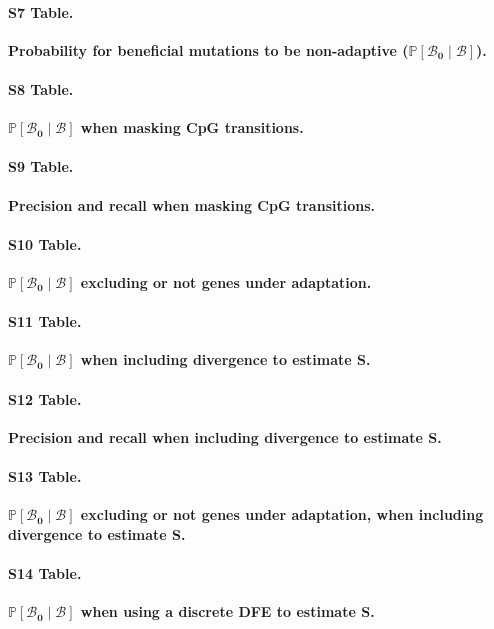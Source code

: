 \documentclass[10pt,letterpaper]{article}
\newcommand{\proba}{\mathbb{P}}
\newcommand{\SphyBen}{\mathcal{B}_0}
\newcommand{\given}{\mid}
\newcommand{\Spop}{S}
\newcommand{\SpopBen}{\mathcal{B}}
\begin{document}
\paragraph*{S7 Table.}
\label{S7_Table}
{\bf Probability for beneficial mutations to be non-adaptive ($\bm{\proba[\SphyBen\given \SpopBen ]}$).}

\paragraph*{S8 Table.}
\label{S8_Table}
{\bf $\bm{\proba[\SphyBen\given \SpopBen ]}$ when masking CpG transitions.}

\paragraph*{S9 Table.}
\label{S9_Table}
{\bf Precision and recall when masking CpG transitions.}

\paragraph*{S10 Table.}
\label{S10_Table}
{\bf $\bm{\proba[\SphyBen\given \SpopBen ]}$ excluding or not genes under adaptation.}

\paragraph*{S11 Table.}
\label{S11_Table}
{\bf $\bm{\proba[\SphyBen\given \SpopBen ]}$ when including divergence to estimate $\bm{\Spop}$.}

\paragraph*{S12 Table.}
\label{S12_Table}
{\bf Precision and recall when including divergence to estimate $\bm{\Spop}$.}

\paragraph*{S13 Table.}
\label{S13_Table}
{\bf $\bm{\proba[\SphyBen\given \SpopBen ]}$ excluding or not genes under adaptation, when including divergence to estimate $\bm{\Spop}$.}

\paragraph*{S14 Table.}
\label{S14_Table}
{\bf $\bm{\proba[\SphyBen\given \SpopBen ]}$ when using a discrete DFE to estimate $\bm{\Spop}$.}
\end{document}
